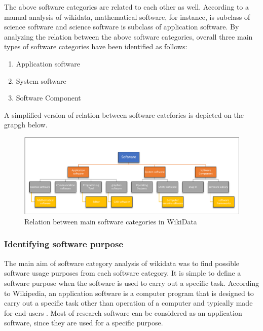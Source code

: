 The above software categories are related to each other as well. According to a manual analysis of wikidata, mathematical software, for instance, is subclass of science software and science software is subclass of application software. By analyzing the relation between the above software categories, overall three main types of software categories have been identified as follows:

\begin{enumerate}
 \item Application software 
 \item System software 
 \item Software Component 

\end{enumerate}

A simplified version of relation between software catefories is depicted on the grapgh below. 

\begin{figure}[htbp]
	\centering
	\includegraphics[width=1\textwidth]{4.graphics/figures/chart}
	\caption{Relation between main software categories in WikiData}
	\label{fig:chapter03:setup}
\end{figure}


\subsubsection{Identifying software purpose}

The main aim of software category analysis of wikidata was to find possible software usage purposes from each software category. It is simple to define a software purpose when the software is used to carry out a specific task. 
According to Wikipedia, an application software is a  computer program that is designed to carry out a specific task other than operation of a computer and typically made for end-users \citep{enwiki:1060918552}. Most of research software can be considered as an application software, since they are used for a specific purpose. 

